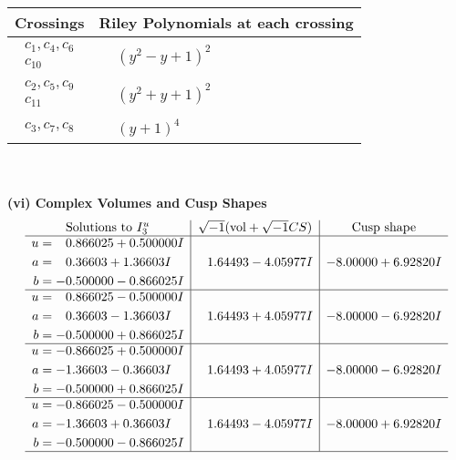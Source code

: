\documentclass[1p]{elsarticle_modified}
\theoremstyle{definition}
\newcommand{\I}{\sqrt{-1}}
\begin{document}
\begin{tabular}{m{50pt}|m{274pt}}
Crossings & \hspace{64pt}Riley Polynomials at each crossing \\
\hline $$\begin{aligned}c_{1},c_{4},c_{6}\\c_{10}\end{aligned}$$&$\begin{aligned}
&(y^2- y+1)^2
\end{aligned}$\\
\hline $$\begin{aligned}c_{2},c_{5},c_{9}\\c_{11}\end{aligned}$$&$\begin{aligned}
&(y^2+y+1)^2
\end{aligned}$\\
\hline $$\begin{aligned}c_{3},c_{7},c_{8}\end{aligned}$$&$\begin{aligned}
&(y+1)^4
\end{aligned}$\\
\hline
\end{tabular}\\~\\
\newpage\flushleft \textbf{(vi) Complex Volumes and Cusp Shapes}
$$\begin{array}{c|c|c}  
\text{Solutions to }I^u_{3}& \I (\text{vol} + \sqrt{-1}CS) & \text{Cusp shape}\\
 \hline 
\begin{aligned}
u &= \phantom{-}0.866025 + 0.500000 I \\
a &= \phantom{-}0.36603 + 1.36603 I \\
b &= -0.500000 - 0.866025 I\end{aligned}
 & \phantom{-}1.64493 - 4.05977 I & -8.00000 + 6.92820 I \\ \hline\begin{aligned}
u &= \phantom{-}0.866025 - 0.500000 I \\
a &= \phantom{-}0.36603 - 1.36603 I \\
b &= -0.500000 + 0.866025 I\end{aligned}
 & \phantom{-}1.64493 + 4.05977 I & -8.00000 - 6.92820 I \\ \hline\begin{aligned}
u &= -0.866025 + 0.500000 I \\
a &= -1.36603 - 0.36603 I \\
b &= -0.500000 + 0.866025 I\end{aligned}
 & \phantom{-}1.64493 + 4.05977 I & -8.00000 - 6.92820 I \\ \hline\begin{aligned}
u &= -0.866025 - 0.500000 I \\
a &= -1.36603 + 0.36603 I \\
b &= -0.500000 - 0.866025 I\end{aligned}
 & \phantom{-}1.64493 - 4.05977 I & -8.00000 + 6.92820 I\\
 \hline 
 \end{array}$$\newpage\newpage\renewcommand{\arraystretch}{1}
\end{document}
